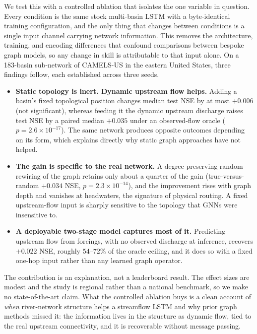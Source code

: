 \documentclass[11pt]{article}
\begin{document}
We test this with a controlled ablation that isolates the one variable in question. Every condition
is the same stock multi-basin LSTM with a byte-identical training configuration, and the only thing
that changes between conditions is a single input channel carrying network information. This removes
the architecture, training, and encoding differences that confound comparisons between bespoke graph
models, so any change in skill is attributable to that input alone. On a 183-basin sub-network of
CAMELS-US in the eastern United States, three findings follow, each established across three seeds.

\begin{itemize}[leftmargin=1.4em,itemsep=2pt,topsep=2pt]
\item \textbf{Static topology is inert. Dynamic upstream flow helps.} Adding a basin's fixed
topological position changes median test NSE by at most $+0.006$ (not significant), whereas feeding
it the dynamic upstream discharge raises test NSE by a paired median $+0.035$ under an observed-flow
oracle ($p=2.6\times10^{-17}$). The same network produces opposite outcomes depending on its form, which
explains directly why static graph approaches have not helped.
\item \textbf{The gain is specific to the real network.} A degree-preserving random rewiring of the
graph retains only about a quarter of the gain (true-versus-random $+0.034$ NSE,
$p=2.3\times10^{-14}$), and the improvement rises with graph depth and vanishes at headwaters, the
signature of physical routing. A fixed upstream-flow input is sharply sensitive to the topology that
GNNs were insensitive to.
\item \textbf{A deployable two-stage model captures most of it.} Predicting upstream flow from
forcings, with no observed discharge at inference, recovers $+0.022$ NSE, roughly $54$--$72\%$
of the oracle ceiling, and it does so with a fixed one-hop input rather than any learned graph
operator.
\end{itemize}

The contribution is an explanation, not a leaderboard result. The effect sizes are modest and the
study is regional rather than a national benchmark, so we make no state-of-the-art claim. What the
controlled ablation buys is a clean account of \emph{when} river-network structure helps a streamflow
LSTM and why prior graph methods missed it: the information lives in the structure as dynamic flow,
tied to the real upstream connectivity, and it is recoverable without message passing.
\end{document}
